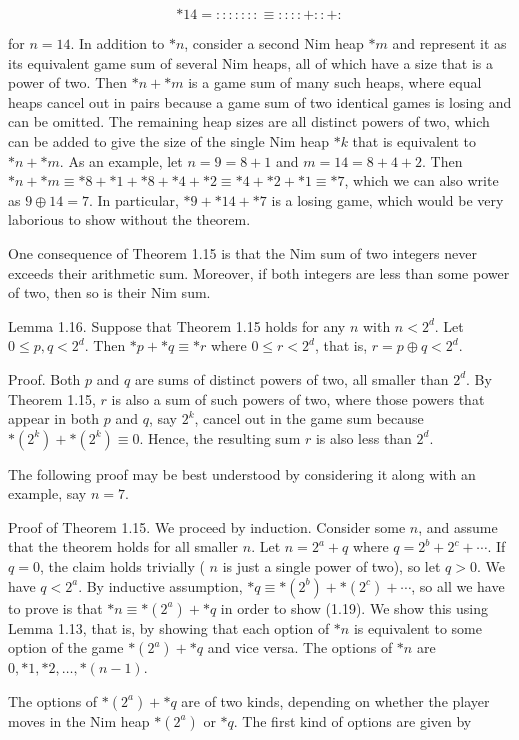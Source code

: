 \documentclass[12pt]{article}
\begin{document}
$$
* 14=::::::: \equiv::::+::+:
$$

for $n=14$. In addition to $* n$, consider a second Nim heap $* m$ and represent it as its equivalent game sum of several Nim heaps, all of which have a size that is a power of two. Then $* n+* m$ is a game sum of many such heaps, where equal heaps cancel out in pairs because a game sum of two identical games is losing and can be omitted. The remaining heap sizes are all distinct powers of two, which can be added to give the size of the single Nim heap $* k$ that is equivalent to $* n+* m$. As an example, let $n=9=8+1$ and $m=14=8+4+2$. Then $* n+* m \equiv * 8+* 1+* 8+* 4+* 2 \equiv * 4+* 2+* 1 \equiv * 7$, which we can also write as $9 \oplus 14=7$. In particular, $* 9+* 14+* 7$ is a losing game, which would be very laborious to show without the theorem.

One consequence of Theorem 1.15 is that the Nim sum of two integers never exceeds their arithmetic sum. Moreover, if both integers are less than some power of two, then so is their Nim sum.

Lemma 1.16. Suppose that Theorem 1.15 holds for any $n$ with $n<2^{d}$. Let $0 \leq p, q<2^{d}$. Then $* p+* q \equiv * r$ where $0 \leq r<2^{d}$, that is, $r=p \oplus q<2^{d}$.

Proof. Both $p$ and $q$ are sums of distinct powers of two, all smaller than $2^{d}$. By Theorem 1.15, $r$ is also a sum of such powers of two, where those powers that appear in both $p$ and $q$, say $2^{k}$, cancel out in the game sum because $*\left(2^{k}\right)+*\left(2^{k}\right) \equiv 0$. Hence, the resulting sum $r$ is also less than $2^{d}$.

The following proof may be best understood by considering it along with an example, say $n=7$.

Proof of Theorem 1.15. We proceed by induction. Consider some $n$, and assume that the theorem holds for all smaller $n$. Let $n=2^{a}+q$ where $q=2^{b}+2^{c}+\cdots$. If $q=0$, the claim holds trivially ( $n$ is just a single power of two), so let $q>0$. We have $q<2^{a}$. By inductive assumption, $* q \equiv *\left(2^{b}\right)+*\left(2^{c}\right)+\cdots$, so all we have to prove is that $* n \equiv *\left(2^{a}\right)+* q$ in order to show (1.19). We show this using Lemma 1.13, that is, by showing that each option of $* n$ is equivalent to some option of the game $*\left(2^{a}\right)+* q$ and vice versa. The options of $* n$ are $0, * 1, * 2, \ldots, *(n-1)$.

The options of $*\left(2^{a}\right)+* q$ are of two kinds, depending on whether the player moves in the Nim heap $*\left(2^{a}\right)$ or $* q$. The first kind of options are given by
\end{document}

